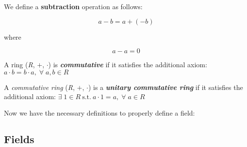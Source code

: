 \documentclass{article}
\begin{document}
\noindent We define a \textbf{subtraction} operation as follows: 

\begin{equation*}
    a - b = a + (- b)
\end{equation*}

\noindent where 

\begin{equation*}
    a - a = 0
\end{equation*}

\begin{theorem}\label{commutativering}
    A ring (\textit{R}, $+$, $\cdot$) is \textbf{\textit{commutative}} if it satisfies the additional axiom: 
    $a \cdot b = b \cdot a, \; \forall \; a, b \in R$
\end{theorem}

\begin{theorem}\label{unitarycommutativering}
    A \textit{commutative ring} (\textit{R}, $+$, $\cdot$) is a \textbf{\textit{unitary commutative ring}} if it satisfies the additional axiom:
    $\exists \; 1 \in R \  \text{s.t.} \  a \cdot 1 = a, \; \forall \; a \in R$
\end{theorem}


\noindent Now we have the necessary definitions to properly define a field:

\subsection{Fields}
\end{document}
